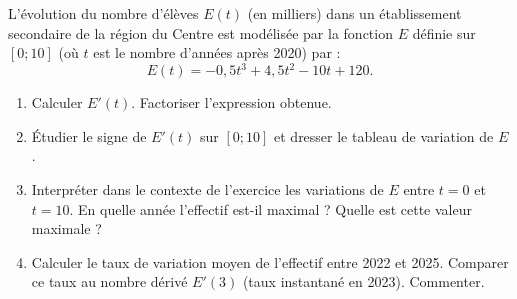 \documentclass[11pt]{article}
\begin{document}
\begin{exercice}
L'évolution du nombre d'élèves $E(t)$ (en milliers) dans un établissement secondaire de la région du Centre est modélisée par la fonction $E$ définie sur $[0 ; 10]$ (où $t$ est le nombre d'années après 2020) par :
\[
E(t) = -0,5t^3 + 4,5t^2 - 10t + 120.
\]
\begin{enumerate}
    \item Calculer $E'(t)$. Factoriser l'expression obtenue.
    \item Étudier le signe de $E'(t)$ sur $[0 ; 10]$ et dresser le tableau de variation de $E$.
    \item Interpréter dans le contexte de l'exercice les variations de $E$ entre $t=0$ et $t=10$. En quelle année l'effectif est-il maximal ? Quelle est cette valeur maximale ?
    \item Calculer le taux de variation moyen de l'effectif entre 2022 et 2025. Comparer ce taux au nombre dérivé $E'(3)$ (taux instantané en 2023). Commenter.
\end{enumerate}
\end{exercice}
\end{document}
